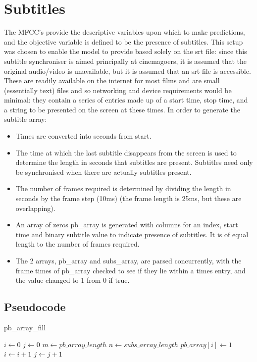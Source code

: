 \section{Subtitles}
The MFCC’s provide the descriptive variables upon which to make predictions, and the objective variable is defined to be the presence of subtitles. This setup was chosen to enable the model to provide based solely on the srt file: since this subtitle synchroniser is aimed principally at cinemagoers, it is assumed that the original audio/video is unavailable, but it is assumed that an srt file is accessible. These are readily available on the internet for most films and are small (essentially text) files and so networking and device requirements would be minimal: they contain a series of entries made up of a start time, stop time, and a string to be presented on the screen at these times. In order to generate the subtitle array:
\begin{itemize}
	\item Times are converted into seconds from start.
	\item The time at which the last subtitle disappears from the screen is used to determine the length in seconds that subtitles are present. Subtitles need only be synchronised when there are actually subtitles present.
	\item The number of frames required is determined by dividing the length in seconds by the frame step (10ms) (the frame length is 25ms, but these are overlapping).
	\item An array of zeros pb\_array is generated with columns for an index, start time and binary subtitle value to indicate presence of subtitles. It is of equal length to the number of frames required.
	\item The 2 arrays, pb\_array and subs\_array, are parsed concurrently, with the frame times of pb\_array checked to see if they lie within a times entry, and the value changed to 1 from 0 if true.
\end{itemize}

\subsection{Pseudocode}
\begin{algorithm}
	\caption{pb\_array\_fill}\label{euclid}
	\begin{algorithmic}[1]
		\State $i \gets 0$
		\State $j \gets 0$
		\State $m \gets pb\_array\_length$
		\State $n \gets subs\_array\_length$
			\BREAK
			\EndIf
			\BREAK
			\EndIf
				\State $pb\_array[i] \gets 1$
				\State $i \gets i+1$
				\EndIf
			\Else
				\State $j \gets j+1$
			\EndIf
		\EndIf
		\EndProcedure
	\end{algorithmic}
\end{algorithm}

